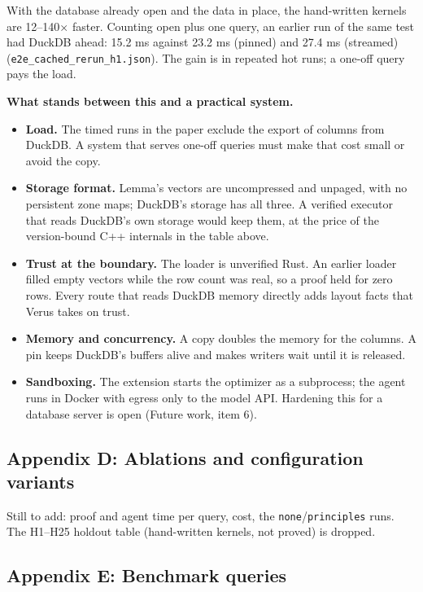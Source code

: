 \documentclass[
]{article}
\newcounter{none} %
\providecommand{\tightlist}{%
  \setlength{\itemsep}{0pt}\setlength{\parskip}{0pt}}
\begin{document}
With the database already open and the data in place, the hand-written
kernels are 12--140× faster. Counting open plus one query, an earlier
run of the same test had DuckDB ahead: 15.2 ms against 23.2 ms (pinned)
and 27.4 ms (streamed) (\texttt{e2e\_cached\_rerun\_h1.json}). The gain
is in repeated hot runs; a one-off query pays the load.

\textbf{What stands between this and a practical system.}

\begin{itemize}
\tightlist
\item
  \textbf{Load.} The timed runs in the paper exclude the export of
  columns from DuckDB. A system that serves one-off queries must make
  that cost small or avoid the copy.
\item
  \textbf{Storage format.} Lemma's vectors are uncompressed and unpaged,
  with no persistent zone maps; DuckDB's storage has all three. A
  verified executor that reads DuckDB's own storage would keep them, at
  the price of the version-bound C++ internals in the table above.
\item
  \textbf{Trust at the boundary.} The loader is unverified Rust. An
  earlier loader filled empty vectors while the row count was real, so a
  proof held for zero rows. Every route that reads DuckDB memory
  directly adds layout facts that Verus takes on trust.
\item
  \textbf{Memory and concurrency.} A copy doubles the memory for the
  columns. A pin keeps DuckDB's buffers alive and makes writers wait
  until it is released.
\item
  \textbf{Sandboxing.} The extension starts the optimizer as a
  subprocess; the agent runs in Docker with egress only to the model
  API. Hardening this for a database server is open (Future work, item
  6).
\end{itemize}

\subsection{Appendix D: Ablations and configuration
variants}\label{appendix-d-ablations-and-configuration-variants}

Still to add: proof and agent time per query, cost, the
\texttt{none}/\texttt{principles} runs. The H1--H25 holdout table
(hand-written kernels, not proved) is dropped.

\subsection{Appendix E: Benchmark
queries}\label{appendix-e-benchmark-queries}
\end{document}
